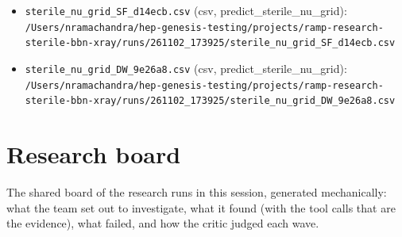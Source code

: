 \documentclass[11pt,a4paper]{article}
\begin{document}
\begin{itemize}
  \item \texttt{sterile\_\allowbreak{}nu\_\allowbreak{}grid\_\allowbreak{}SF\_\allowbreak{}d14ecb.csv} (csv, predict\_sterile\_nu\_grid): \texttt{/\allowbreak{}Users/\allowbreak{}nramachandra/\allowbreak{}hep-genesis-testing/\allowbreak{}projects/\allowbreak{}ramp-research-sterile-bbn-xray/\allowbreak{}runs/\allowbreak{}261102\_\allowbreak{}173925/\allowbreak{}sterile\_\allowbreak{}nu\_\allowbreak{}grid\_\allowbreak{}SF\_\allowbreak{}d14ecb.csv}
  \item \texttt{sterile\_\allowbreak{}nu\_\allowbreak{}grid\_\allowbreak{}DW\_\allowbreak{}9e26a8.csv} (csv, predict\_sterile\_nu\_grid): \texttt{/\allowbreak{}Users/\allowbreak{}nramachandra/\allowbreak{}hep-genesis-testing/\allowbreak{}projects/\allowbreak{}ramp-research-sterile-bbn-xray/\allowbreak{}runs/\allowbreak{}261102\_\allowbreak{}173925/\allowbreak{}sterile\_\allowbreak{}nu\_\allowbreak{}grid\_\allowbreak{}DW\_\allowbreak{}9e26a8.csv}
\end{itemize}

\section{Research board}
\label{app:board}
The shared board of the research runs in this session, generated mechanically: what the team set out to investigate, what it found (with the tool calls that are the evidence), what failed, and how the critic judged each wave.
\end{document}
